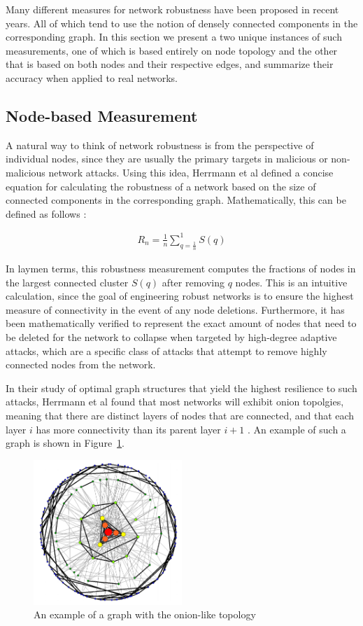 \documentclass[11pt]{article}
\begin{document}
Many different measures for network robustness have been proposed in recent years. All of which tend
to use the notion of densely connected components in the corresponding graph. In this section we present
a two unique instances of such measurements, one of which is based entirely on node topology and the other that is based on both nodes and their respective edges, and summarize their accuracy when applied to real networks.

\subsection{Node-based Measurement}
A natural way to think of network robustness is from the perspective of individual nodes, since they are 
usually the primary targets in malicious or non-malicious network attacks. Using this idea, Herrmann et al
defined a concise equation for calculating the robustness of a network based on the size of connected
components in the corresponding graph. Mathematically, this can be defined as follows \cite{Onion}:

\begin{eqnarray*}
R_{n} = \frac{1}{n}\sum_{q=\frac{1}{n}}^{1}S(q)
\end{eqnarray*}

In laymen terms, this robustness measurement computes the fractions of nodes in the largest connected cluster $S(q)$ after removing $q$ nodes. This is an intuitive calculation, since the goal of engineering robust networks is to ensure the highest measure of connectivity in the event of any node deletions. Furthermore, it has been mathematically verified to represent the exact amount of nodes that need to be deleted for the network to collapse when targeted by high-degree adaptive attacks, which are a specific class of attacks that attempt to remove highly connected nodes from the network. 

In their study of optimal graph structures that yield the highest resilience to such attacks, Herrmann et al found that most networks will exhibit onion topolgies, meaning that there are distinct layers of nodes that are connected, and that each layer $i$ has more connectivity than its parent layer $i+1$ \cite{Onion}. An example of such a graph is shown in Figure~\ref{fig:Onion}.

\begin{figure}[h!]
	\label{fig:Onion}
	\centering
		\includegraphics[width=0.5\textwidth]{Onion.jpg}
	\caption{An example of a graph with the onion-like topology \cite{Onion}}
\end{figure}
\end{document}
